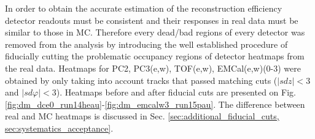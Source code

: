 In order to obtain the accurate estimation of the reconstruction efficiency detector readouts must be consistent and their responses in real data must be similar to those in MC.
Therefore every dead/bad regions of every detector was removed from the analysis by introducing the well established procedure of fiducially cutting the problematic occupancy regions of detector heatmaps from the real data. 
Heatmaps for PC2, PC3(e,w), TOF(e,w), EMCal(e,w)(0-3) were obtained by only taking into account tracks that passed matching cuts ($\lvert sdz \rvert < 3$ and $\lvert sd\varphi \rvert < 3$).
Heatmaps before and after fiducial cuts are presented on Fig. \ref{fig:dm_dce0_run14heau}-\ref{fig:dm_emcalw3_run15pau}.
The difference between real and MC heatmaps is discussed in Sec. \ref{sec:additional_fiducial_cuts, sec:systematics_acceptance}.
